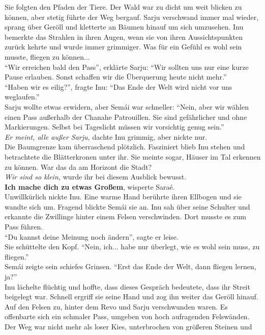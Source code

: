 Sie folgten den Pfaden der Tiere. Der Wald war zu dicht um weit blicken zu können, aber stetig 
führte der Weg bergauf. Sarju verschwand immer mal wieder, sprang über Geröll und kletterte an 
Bäumen hinauf um sich umzusehen. Inu bemerkte das Strahlen in ihren Augen, wenn sie von ihren 
Aussichtspunkten zurück kehrte und wurde immer grimmiger. Was für ein Gefühl es wohl sein musste, 
fliegen zu können...\\
``Wir erreichen bald den Pass'', erklärte Sarju: ``Wir sollten uns nur eine kurze Pause erlauben. 
Sonst schaffen wir die Überquerung heute nicht mehr.''\\
``Haben wir es eilig?'', fragte Inu: ``Das Ende der Welt wird nicht vor uns weglaufen.''\\
Sarju wollte etwas erwidern, aber Semái war schneller: ``Nein, aber wir wählen einen Pass außerhalb 
der Chanahe Patrouillen. Sie sind gefährlicher und ohne Markierungen. Selbst bei Tageslicht müssen 
wir vorsichtig genug sein.''\\
\textit{Er meint, alle außer Sarju,} dachte Inu grimmig, aber nickte nur.\\
Die Baumgrenze kam überraschend plötzlich. Fasziniert blieb Inu stehen und betrachtete die 
Blätterkronen unter ihr. Sie meinte sogar, Häuser im Tal erkennen zu können. War das da am Horizont 
die Stadt?\\
\textit{Wir sind so klein,} wurde ihr bei diesem Ausblick bewusst.\\
\textbf{Ich mache dich zu etwas Großem}, wisperte Saraé.\\
Unwillkürlich nickte Inu. Eine warme Hand berührte ihren Ellbogen und sie wandte sich um. Fragend 
blickte Semái sie an. Inu sah über seine Schulter und erkannte die Zwillinge hinter einem Felsen 
verschwinden. Dort musste es zum Pass führen.\\
``Du kannst deine Meinung noch ändern'', sagte er leise.\\
Sie schüttelte den Kopf. ``Nein, ich... habe nur überlegt, wie es wohl sein muss, zu fliegen.''\\
Semái zeigte sein schiefes Grinsen. ``Erst das Ende der Welt, dann fliegen lernen, ja?''\\
Inu lächelte flüchtig und hoffte, dass dieses Gespräch bedeutete, dass ihr Streit beigelegt war. 
Schnell ergriff sie seine Hand und zog ihn weiter das Geröll hinauf. Auf den Felsen zu, hinter dem 
Revo und Sarju verschwunden waren. Es offenbarte sich ein schmaler Pass, umgeben von hoch 
aufragenden Felswänden. Der Weg war nicht mehr als loser Kies, unterbrochen von größeren Steinen und 

